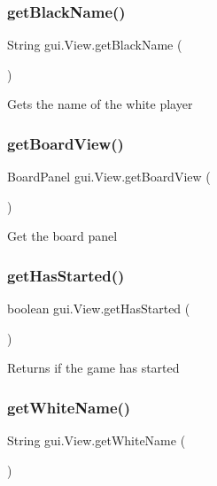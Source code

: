 \subsubsection{\texorpdfstring{get\+Black\+Name()}{getBlackName()}}
{\footnotesize\ttfamily String gui.\+View.\+get\+Black\+Name (\begin{DoxyParamCaption}{ }\end{DoxyParamCaption})}

Gets the name of the white player \mbox{\label{classgui_1_1_view_ad5f7dc8f550cc8895c4da9b5ea8d4b98}} 
\subsubsection{\texorpdfstring{get\+Board\+View()}{getBoardView()}}
{\footnotesize\ttfamily Board\+Panel gui.\+View.\+get\+Board\+View (\begin{DoxyParamCaption}{ }\end{DoxyParamCaption})}

Get the board panel \mbox{\label{classgui_1_1_view_a958e1dcd8f0a252266b292bff7af26dd}} 
\subsubsection{\texorpdfstring{get\+Has\+Started()}{getHasStarted()}}
{\footnotesize\ttfamily boolean gui.\+View.\+get\+Has\+Started (\begin{DoxyParamCaption}{ }\end{DoxyParamCaption})}

Returns if the game has started \mbox{\label{classgui_1_1_view_a0c82f77f67a8131b03a10d73cb9e5934}} 
\subsubsection{\texorpdfstring{get\+White\+Name()}{getWhiteName()}}
{\footnotesize\ttfamily String gui.\+View.\+get\+White\+Name (\begin{DoxyParamCaption}{ }\end{DoxyParamCaption})}

